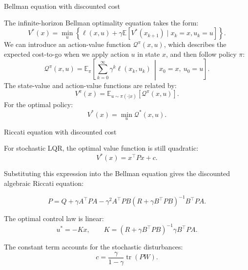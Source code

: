 \documentclass{beamer}
\begin{document}
\begin{frame}{Bellman equation with discounted cost}
	\begin{flushleft}
		
		The infinite-horizon Bellman optimality equation takes the form:
		\[
		V^*(x)=
		\min_u\left\{
		\ell(x,u)+
		\gamma\mathbb{E}\left[
		V^*(x_{k+1})\mid x_k=x,u_k=u
		\right]
		\right\}.
		\]
		We can introduce an action-value function $\mathcal{Q}^\pi(x,u)$,
		which describes the expected cost-to-go when we apply action $u$
		in state $x$, and then follow policy $\pi$:
		\[
		\mathcal{Q}^\pi(x,u)=
		\mathbb{E}_\pi\left[
		\sum_{k=0}^{\infty}\gamma^k\ell(x_k,u_k)
		\,\middle|\,
		x_0=x,\ u_0=u
		\right].
		\]
		The state-value and action-value functions are related by:
		\[
		V^\pi(x)=
		\mathbb{E}_{u\sim\pi(\cdot|x)}
		[\mathcal{Q}^\pi(x,u)].
		\]
		For the optimal policy:
		\[
		V^*(x)=\min_u \mathcal{Q}^*(x,u).
		\]
		
	\end{flushleft}
\end{frame}


\begin{frame}{Riccati equation with discounted cost}
	\begin{flushleft}
		
		For stochastic LQR, the optimal value function is still quadratic:
		\[
		V^*(x)=x^\top Px+c.
		\]
		
		Substituting this expression into the Bellman equation gives
		the discounted algebraic Riccati equation:
		
		\[
				P=Q+\gamma A^\top PA
-\gamma^2 A^\top PB
(R+\gamma B^\top PB)^{-1}
B^\top PA.
		\]
		
		The optimal control law is linear:
		\[
			u^*=-Kx,\qquad
K=(R+\gamma B^\top PB)^{-1}
\gamma B^\top PA.
		\]
		
		The constant term accounts for the stochastic disturbances:
		\[
			c=\frac{\gamma}{1-\gamma}
\operatorname{tr}(PW).
		\]
		
	\end{flushleft}
\end{frame}
\end{document}
